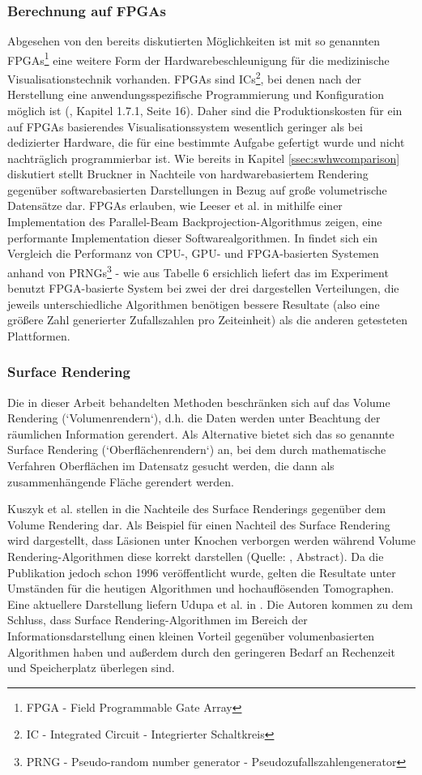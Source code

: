 \documentclass[a4paper,titlepage,12pt]{scrartcl}
\begin{document}
\subsubsection{Berechnung auf FPGAs}
Abgesehen von den bereits diskutierten Möglichkeiten ist mit so genannten FPGAs\footnote{FPGA - Field Programmable Gate Array} eine weitere Form der Hardwarebeschleunigung für die medizinische Visualisationstechnik vorhanden. FPGAs sind ICs\footnote{IC - Integrated Circuit - Integrierter Schaltkreis}, bei denen nach der Herstellung eine anwendungsspezifische Programmierung und Konfiguration möglich ist (\cite{Kibritev2009}, Kapitel 1.7.1, Seite 16). Daher sind die Produktionskosten für ein auf FPGAs basierendes Visualisationssystem wesentlich geringer als bei dedizierter Hardware, die für eine bestimmte Aufgabe gefertigt wurde und nicht nachträglich programmierbar ist. Wie bereits in Kapitel \vref{ssec:swhwcomparison} diskutiert stellt Bruckner in \cite{Bruckner2008} Nachteile von hardwarebasiertem Rendering gegenüber softwarebasierten Darstellungen in Bezug auf große volumetrische Datensätze dar. FPGAs erlauben, wie Leeser et al. in \cite{Leeser2005} mithilfe einer Implementation des Parallel-Beam Backprojection-Algorithmus zeigen, eine performante Implementation dieser Softwarealgorithmen. In \cite{Thomas2009} findet sich ein Vergleich die Performanz von CPU-, GPU- und FPGA-basierten Systemen anhand von PRNGs\footnote{PRNG - Pseudo-random number generator - Pseudozufallszahlengenerator} - wie aus Tabelle 6 ersichlich liefert das im Experiment benutzt FPGA-basierte System bei zwei der drei dargestellen Verteilungen, die jeweils unterschiedliche Algorithmen benötigen bessere Resultate (also eine größere Zahl generierter Zufallszahlen pro Zeiteinheit) als die anderen getesteten Plattformen.
\subsubsection{Surface Rendering}
Die in dieser Arbeit behandelten Methoden beschränken sich auf das Volume Rendering (`Volumenrendern`), d.h. die Daten werden unter Beachtung der räumlichen Information gerendert. Als Alternative bietet sich das so genannte Surface Rendering (`Oberflächenrendern`) an, bei dem durch mathematische Verfahren Oberflächen im Datensatz gesucht werden, die dann als zusammenhängende Fläche gerendert werden.

Kuszyk et al. stellen in \cite{Kuszyk1996} die Nachteile des Surface Renderings gegenüber dem Volume Rendering dar. Als Beispiel für einen Nachteil des Surface Rendering wird dargestellt, dass Läsionen unter Knochen verborgen werden während Volume Rendering-Algorithmen diese korrekt darstellen (Quelle: \cite{Kuszyk1996}, Abstract). Da die Publikation jedoch schon 1996 veröffentlicht wurde, gelten die Resultate unter Umständen für die heutigen Algorithmen und hochauflösenden Tomographen. Eine aktuellere Darstellung liefern Udupa et al. in \cite{Udupa2009}. Die Autoren kommen zu dem Schluss, dass Surface Rendering-Algorithmen im Bereich der Informationsdarstellung einen kleinen Vorteil gegenüber volumenbasierten Algorithmen haben und außerdem durch den geringeren Bedarf an Rechenzeit und Speicherplatz überlegen sind.
\end{document}
